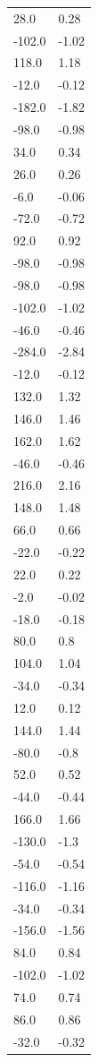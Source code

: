 \begin{longtable}{ll}
28.0 & 0.28 \\
-102.0 & -1.02 \\
118.0 & 1.18 \\
-12.0 & -0.12 \\
-182.0 & -1.82 \\
-98.0 & -0.98 \\
34.0 & 0.34 \\
26.0 & 0.26 \\
-6.0 & -0.06 \\
-72.0 & -0.72 \\
92.0 & 0.92 \\
-98.0 & -0.98 \\
-98.0 & -0.98 \\
-102.0 & -1.02 \\
-46.0 & -0.46 \\
-284.0 & -2.84 \\
-12.0 & -0.12 \\
132.0 & 1.32 \\
146.0 & 1.46 \\
162.0 & 1.62 \\
-46.0 & -0.46 \\
216.0 & 2.16 \\
148.0 & 1.48 \\
66.0 & 0.66 \\
-22.0 & -0.22 \\
22.0 & 0.22 \\
-2.0 & -0.02 \\
-18.0 & -0.18 \\
80.0 & 0.8 \\
104.0 & 1.04 \\
-34.0 & -0.34 \\
12.0 & 0.12 \\
144.0 & 1.44 \\
-80.0 & -0.8 \\
52.0 & 0.52 \\
-44.0 & -0.44 \\
166.0 & 1.66 \\
-130.0 & -1.3 \\
-54.0 & -0.54 \\
-116.0 & -1.16 \\
-34.0 & -0.34 \\
-156.0 & -1.56 \\
84.0 & 0.84 \\
-102.0 & -1.02 \\
74.0 & 0.74 \\
86.0 & 0.86 \\
-32.0 & -0.32 \\

\end{longtable}
